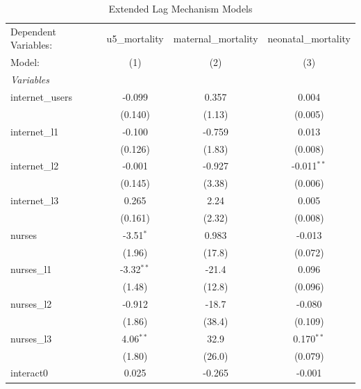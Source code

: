 \begin{table}[htbp]
   \caption{\label{tab:lag_mechanism} Extended Lag Mechanism Models}
   \centering
   \begin{tabular}{lccc}
      \tabularnewline \midrule \midrule
      Dependent Variables: & u5\_mortality  & maternal\_mortality  & neonatal\_mortality\\   
      Model:               & (1)            & (2)                  & (3)\\  
      \midrule
      \emph{Variables}\\
      internet\_users      & -0.099         & 0.357                & 0.004\\   
                           & (0.140)        & (1.13)               & (0.005)\\   
      internet\_l1         & -0.100         & -0.759               & 0.013\\   
                           & (0.126)        & (1.83)               & (0.008)\\   
      internet\_l2         & -0.001         & -0.927               & -0.011$^{**}$\\   
                           & (0.145)        & (3.38)               & (0.006)\\   
      internet\_l3         & 0.265          & 2.24                 & 0.005\\   
                           & (0.161)        & (2.32)               & (0.008)\\   
      nurses               & -3.51$^{*}$    & 0.983                & -0.013\\   
                           & (1.96)         & (17.8)               & (0.072)\\   
      nurses\_l1           & -3.32$^{**}$   & -21.4                & 0.096\\   
                           & (1.48)         & (12.8)               & (0.096)\\   
      nurses\_l2           & -0.912         & -18.7                & -0.080\\   
                           & (1.86)         & (38.4)               & (0.109)\\   
      nurses\_l3           & 4.06$^{**}$    & 32.9                 & 0.170$^{**}$\\   
                           & (1.80)         & (26.0)               & (0.079)\\   
      interact0            & 0.025          & -0.265               & -0.001\\   

\end{tabular}
\end{table}
